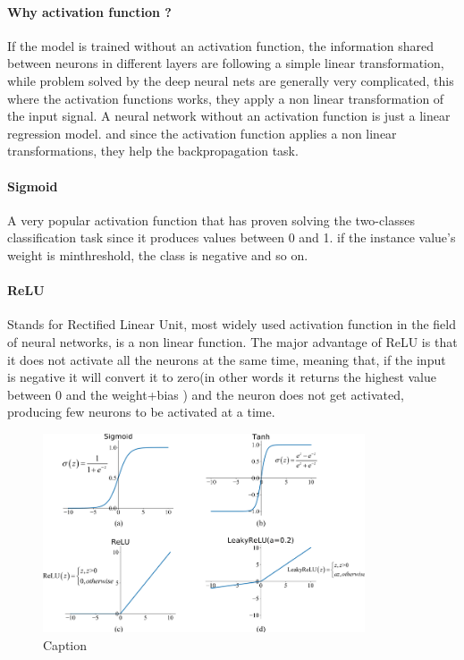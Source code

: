 \paragraph{Why activation function ?} If the model is trained without an activation function,
the information shared between neurons in different layers are following a simple
linear transformation, while problem solved by the deep neural nets are generally
very complicated, this where the activation functions works, they apply a non linear
transformation of the input signal. A neural network without an activation function is
just a linear regression model. and since the activation function applies a non linear
transformations, they help the backpropagation task.

\paragraph{Sigmoid} A very popular activation function that has proven solving the two-classes
classification task since it produces values between 0 and 1. if the instance value’s weight
is minthreshold, the class is negative and so on.

\paragraph{ReLU} Stands for Rectified Linear Unit, most widely used activation function in the
field of neural networks, is a non linear function.
The major advantage of ReLU is that it does not activate all the neurons at the same
time, meaning that, if the input is negative it will convert it to zero(in other words it
returns the highest value between 0 and the weight+bias ) and the neuron does not get
activated, producing few neurons to be activated at a time.
\begin{figure}[!h]
    \centering
    \includegraphics[width=0.85\textwidth]{chapters/chapter02/fig02/act.PNG}
    \caption{Caption}
    \label{fig:my_label}
\end{figure}


